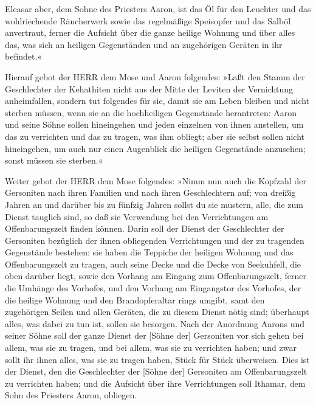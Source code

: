 Eleasar aber, dem Sohne des Priesters Aaron, ist das Öl
für den Leuchter und das wohlriechende Räucherwerk sowie das regelmäßige
Speisopfer und das Salböl anvertraut, ferner die Aufsicht über die ganze
heilige Wohnung und über alles das, was sich an heiligen Gegenständen
und an zugehörigen Geräten in ihr befindet.«

Hierauf gebot der HERR dem Mose und Aaron folgendes:
»Laßt den Stamm der Geschlechter der Kehathiten nicht aus
der Mitte der Leviten der Vernichtung anheimfallen,
sondern tut folgendes für sie, damit sie am Leben bleiben
und nicht sterben müssen, wenn sie an die hochheiligen Gegenstände
herantreten: Aaron und seine Söhne sollen hineingehen und jeden
einzelnen von ihnen anstellen, um das zu verrichten und das zu tragen,
was ihm obliegt; aber sie selbst sollen nicht
hineingehen, um auch nur einen Augenblick die heiligen Gegenstände
anzusehen; sonst müssen sie sterben.«

Weiter gebot der HERR dem Mose folgendes:
»Nimm nun auch die Kopfzahl der Gersoniten nach ihren
Familien und nach ihren Geschlechtern auf; von dreißig
Jahren an und darüber bis zu fünfzig Jahren sollst du sie mustern, alle,
die zum Dienst tauglich sind, so daß sie Verwendung bei den
Verrichtungen am Offenbarungszelt finden können. Darin
soll der Dienst der Geschlechter der Gersoniten bezüglich der ihnen
obliegenden Verrichtungen und der zu tragenden Gegenstände bestehen:
sie haben die Teppiche der heiligen Wohnung und das
Offenbarungszelt zu tragen, auch seine Decke und die Decke von
Seekuhfell, die oben darüber liegt, sowie den Vorhang am Eingang zum
Offenbarungszelt, ferner die Umhänge des Vorhofes, und
den Vorhang am Eingangstor des Vorhofes, der die heilige Wohnung und den
Brandopferaltar rings umgibt, samt den zugehörigen Seilen und allen
Geräten, die zu diesem Dienst nötig sind; überhaupt alles, was dabei zu
tun ist, sollen sie besorgen. Nach der Anordnung Aarons
und seiner Söhne soll der ganze Dienst der {[}Söhne der{]} Gersoniten
vor sich gehen bei allem, was sie zu tragen, und bei allem, was sie zu
verrichten haben; und zwar sollt ihr ihnen alles, was sie zu tragen
haben, Stück für Stück überweisen. Dies ist der Dienst,
den die Geschlechter der {[}Söhne der{]} Gersoniten am Offenbarungszelt
zu verrichten haben; und die Aufsicht über ihre Verrichtungen soll
Ithamar, dem Sohn des Priesters Aaron, obliegen.

